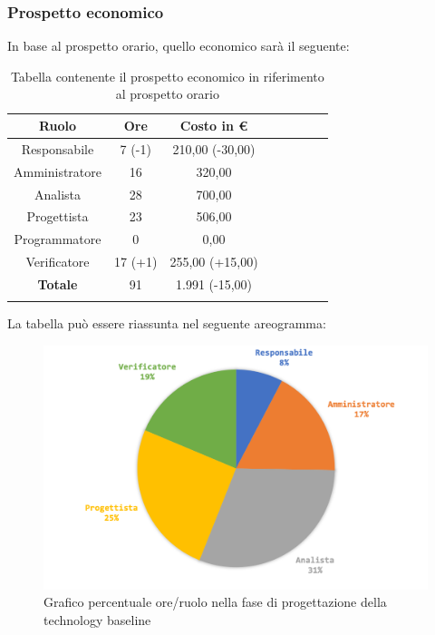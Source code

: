 		\subsubsection{Prospetto economico}
			In base al prospetto orario, quello economico sarà il seguente: 
			
			\begin{longtable}{|c|c|c|c|c|c|c|c}
				\hline
				\rowcolor{lighter-grayer}
				\textbf{Ruolo} & \textbf{Ore} & \textbf{Costo in €} \\
				\hline
				\endfirsthead
				\hline
			Responsabile 	    & 7 (-1) & 210,00 (-30,00)\\
			\hline 
			\hline
			Amministratore	  & 16 & 320,00\\
			\hline
			\hline
			Analista 				& 28 & 700,00\\
			\hline
			\hline
			Progettista 		  & 23 & 506,00\\
			\hline
			\hline
			Programmatore 	 & 0 & 0,00\\
			\hline
			\hline
			Verificatore 		  & 17 (+1) & 255,00 (+15,00)\\
			\hline
			\textbf{Totale} 	& 91 & 1.991 (-15,00)\\
			\hline
				
				\caption{Tabella contenente il prospetto economico in riferimento al prospetto orario}
			\end{longtable}
			
			La tabella può essere riassunta nel seguente areogramma:
			\begin{figure}[H]
				\centering
				\includegraphics[width=0.8\linewidth]{images/consuntivo/ConsCorrez2.png}
				\caption{Grafico percentuale ore/ruolo nella fase di progettazione della technology baseline}
				\label{fig:grafico costi ruolo fase progettazione della technology baseline}
			\end{figure}
		

